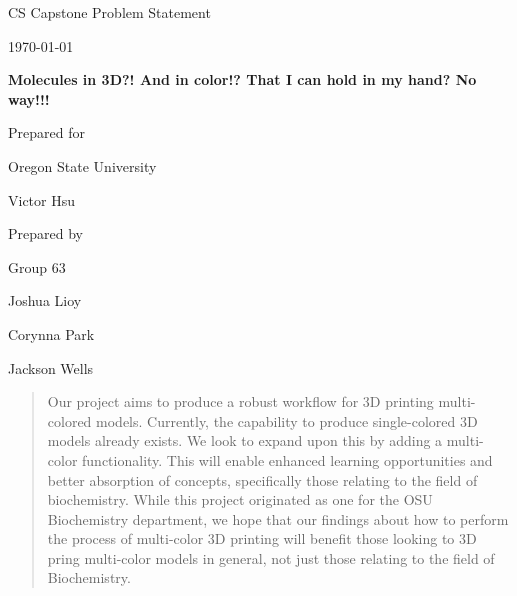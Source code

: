 \documentclass[onecolumn, draftclsnofoot,10pt, compsoc]{IEEEtran}
\def \CapstoneTeamName{		The Cleverly Named Team}
\def \CapstoneTeamNumber{		63}
\def \GroupMemberOne{			Joshua Lioy}
\def \GroupMemberTwo{			Corynna Park}
\def \GroupMemberThree{			Jackson Wells}
\def \CapstoneProjectName{		Molecules in 3D?! And in color!? That I can hold in my hand? No way!!!}
\def \CapstoneSponsorCompany{		Oregon State University}
\def \CapstoneSponsorPerson{		Victor Hsu}
\def \DocType{			Problem Statement
				}
\newcommand{\NameSigPair}[1]{\par
\makebox[2.75in][r]{#1} \hfil 	\makebox[3.25in]{\makebox[2.25in]{\hrulefill} \hfill		\makebox[.75in]{\hrulefill}}
\par\vspace{-12pt} \textit{\tiny\noindent
\makebox[2.75in]{} \hfil		\makebox[3.25in]{\makebox[2.25in][r]{Signature} \hfill	\makebox[.75in][r]{Date}}}}
\renewcommand{\NameSigPair}[1]{#1}
\begin{document}
\begin{titlepage}
    \begin{singlespace}
        \hfill 
        \par\vspace{.2in}
        \centering
        \scshape{
            \huge CS Capstone \DocType \par
            {\large\today}\par
            \vspace{.5in}
            \textbf{\Huge\CapstoneProjectName}\par
            \vfill
            {\large Prepared for}\par
            \Huge \CapstoneSponsorCompany\par
            \vspace{5pt}
            {\Large\NameSigPair{\CapstoneSponsorPerson}\par}
            {\large Prepared by }\par
            Group\CapstoneTeamNumber\par
            \vspace{5pt}
            {\Large
                \NameSigPair{\GroupMemberOne}\par
                \NameSigPair{\GroupMemberTwo}\par
                \NameSigPair{\GroupMemberThree}\par
            }
            \vspace{20pt}
        }
        \begin{abstract}
	    Our project aims to produce a robust workflow for 3D printing multi-colored models. 
	    Currently, the capability to produce single-colored 3D models already exists. 
	    We look to expand upon this by adding a multi-color functionality.
	    This will enable enhanced learning opportunities and better absorption of concepts, specifically those relating to the field of biochemistry. 
	    While this project originated as one for the OSU Biochemistry department, we hope that our findings about how to perform the process of multi-color 3D printing will benefit those looking to 3D pring multi-color models in general, not just those relating to the field of Biochemistry.


\end{abstract}
\end{singlespace}
\end{titlepage}
\end{document}
